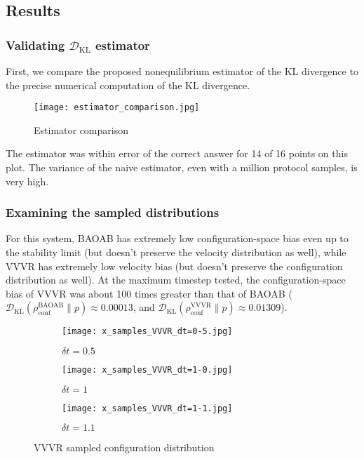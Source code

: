 \documentclass[11pt]{article}
\newcommand{\kldiv}{\mathcal{D}_\text{KL}}
\newcommand{\conf}{\rho_\text{conf}}
\begin{document}
\subsection{Results}

\subsubsection{Validating $\kldiv$ estimator}
First, we compare the proposed nonequilibrium estimator of the KL divergence to the precise numerical computation of the KL divergence.

\begin{figure}[h]
	\centering
	\texttt{[image: estimator\_comparison.jpg]}
	\caption{Estimator comparison}
\end{figure}

The estimator was within error of the correct answer for 14 of 16 points on this plot.
The variance of the naive estimator, even with a million protocol samples, is very high.

\subsubsection{Examining the sampled distributions}
For this system, BAOAB has extremely low configuration-space bias even up to the stability limit (but doesn't preserve the velocity distribution as well), while VVVR has extremely low velocity bias (but doesn't preserve the configuration distribution as well).
At the maximum timestep tested, the configuration-space bias of VVVR was about 100 times greater than that of BAOAB ($\kldiv(\conf^\text{BAOAB} \| p) \approx 0.00013$, and $\kldiv(\conf^\text{VVVR} \| p) \approx 0.01309$).

\begin{figure}[H] %
    \centering
    \begin{subfigure}[b]{0.3\textwidth}
        \texttt{[image: x\_samples\_VVVR\_dt=0-5.jpg]}
        \caption{$\delta t = 0.5$}
    \end{subfigure}
    \begin{subfigure}[b]{0.3\textwidth}
        \texttt{[image: x\_samples\_VVVR\_dt=1-0.jpg]}
        \caption{$\delta t = 1$}
    \end{subfigure}
    \begin{subfigure}[b]{0.3\textwidth}
        \texttt{[image: x\_samples\_VVVR\_dt=1-1.jpg]}
        \caption{$\delta t = 1.1$}
    \end{subfigure}
    \caption{VVVR sampled configuration distribution}
\end{figure}
\end{document}
